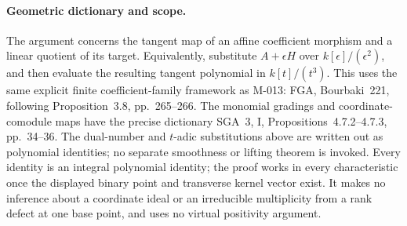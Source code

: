 \paragraph{Geometric dictionary and scope.}
The argument concerns the tangent map of an affine
coefficient morphism and a linear quotient of its target.
Equivalently, substitute \(A+\epsilon H\) over
\(k[\epsilon]/(\epsilon^2)\), and then evaluate the
resulting tangent polynomial in \(k[t]/(t^3)\).
This uses the same explicit finite coefficient-family
framework as M-013: FGA, Bourbaki~221, following
Proposition~3.8, pp.~265--266. The monomial gradings and
coordinate-comodule maps have the precise dictionary
SGA~3, I, Propositions~4.7.2--4.7.3, pp.~34--36.
The dual-number and \(t\)-adic substitutions above are
written out as polynomial identities; no separate
smoothness or lifting theorem is invoked.
Every identity is an integral polynomial identity;
the proof works in every characteristic once the displayed
binary point and transverse kernel vector exist.
It makes no inference about a coordinate ideal or an
irreducible multiplicity from a rank defect at one base
point, and uses no virtual positivity argument.
